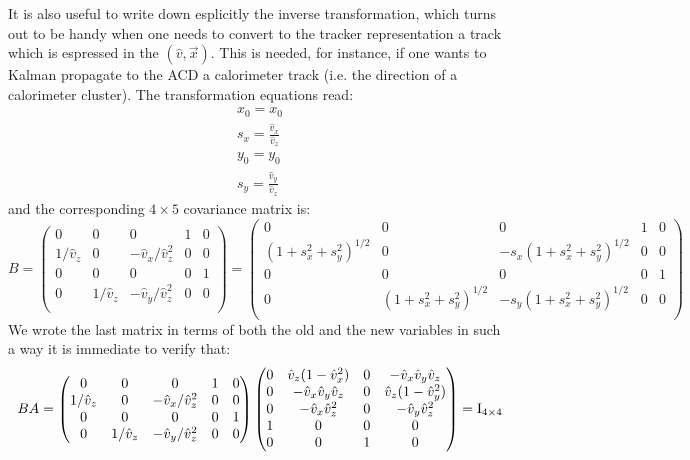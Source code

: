 \documentclass[fleqn,twoside,draft]{article}
\begin{document}
It is also useful to write down esplicitly the inverse transformation, which turns out to be handy when one needs to convert to the tracker representation a track which is espressed in the $(\hat{v},\vec{x})$. This is needed, for instance, if one wants to Kalman propagate to the ACD a calorimeter track (i.e. the direction of a calorimeter cluster).
The transformation equations read:
\begin{subequations}
  \begin{gather}
   x_0 = x_0\\
    s_x = \frac{\hat{v}_x}{\hat{v}_z}\\
    y_0 = y_0\\
    s_y = \frac{\hat{v}_y}{\hat{v}_z}
  \end{gather}
\end{subequations}
and the corresponding $4\times5$ covariance matrix is:
\begin{equation}
  B = 
  \begin{pmatrix}
   0  & 0 & 0 & 1 & 0\\
   1/\hat{v}_z  & 0 & -\hat{v}_x/\hat{v}_z^2 & 0 & 0\\
   0  & 0 & 0 & 0 & 1\\
   0  & 1/\hat{v}_z & -\hat{v}_y/\hat{v}_z^2 & 0 & 0\\
  \end{pmatrix}
    =
  \begin{pmatrix}
   0  & 0 & 0 & 1 & 0\\
   (1 + s_x^2 + s_y^2)^{1/2}  & 0 & -s_x(1 + s_x^2 + s_y^2)^{1/2} & 0 & 0\\
    0 & 0 & 0 & 0 & 1\\
    0 & (1 + s_x^2 + s_y^2)^{1/2} & -s_y(1 + s_x^2 + s_y^2)^{1/2} & 0 & 0\\
  \end{pmatrix}
\end{equation}
We wrote the last matrix in terms of both the old and the new variables in such a way it is immediate to verify that:
\begin{equation}
  BA = 
  \begin{pmatrix}
   0  & 0 & 0 & 1 & 0\\
   1/\hat{v}_z  & 0 & -\hat{v}_x/\hat{v}_z^2 & 0 & 0\\
   0  & 0 & 0 & 0 & 1\\
   0  & 1/\hat{v}_z & -\hat{v}_y/\hat{v}_z^2 & 0 & 0\\
  \end{pmatrix}
  \begin{pmatrix}
    0 & \hat{v}_z ( 1 - { \hat{v}_x } ^2 ) & 0 & -\hat{v}_x\hat{v}_y\hat{v}_z \\
    0 & -\hat{v}_x\hat{v}_y\hat{v}_z & 0 & \hat{v}_z ( 1 - { \hat{v}_y } ^2 ) \\
    0 & -\hat{v}_x{\hat{v}_z}^2 & 0 & -\hat{v}_y{\hat{v}_z}^2\\
    1 & 0 & 0 & 0 \\
    0 & 0 & 1 & 0 
  \end{pmatrix}
  = {\rm I_{4\times4}}
\end{equation}
\end{document}
